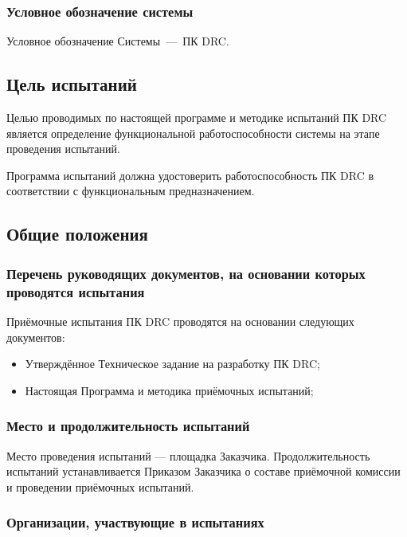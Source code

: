 \subsubsection{Условное обозначение системы}

Условное обозначение Системы --- ПК DRC.

\subsection{Цель испытаний}

Целью проводимых по настоящей программе и методике испытаний ПК DRC
является определение функциональной работоспособности системы
на этапе проведения испытаний. 

Программа испытаний должна удостоверить работоспособность ПК DRC
в соответствии с функциональным предназначением.

\subsection{Общие положения}

\subsubsection{Перечень руководящих документов,
	на основании которых проводятся испытания}

Приёмочные испытания ПК DRC проводятся на основании следующих документов:

\begin{itemize}
	\item Утверждённое Техническое задание на разработку ПК DRC;
	\item Настоящая Программа и методика приёмочных испытаний;
\end{itemize}

\subsubsection{Место и продолжительность испытаний}

Место проведения испытаний --- площадка Заказчика.
Продолжительность испытаний устанавливается Приказом Заказчика
о составе приёмочной комиссии и проведении приёмочных испытаний.

\subsubsection{Организации, участвующие в испытаниях}

